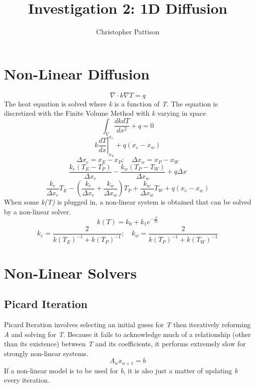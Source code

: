 \documentclass[12pt,twocolumn]{article}
\title{\vspace{-2.5em}Investigation 2: 1D Diffusion}
\author{Christopher Pattison}
\date{}
\begin{document}
\maketitle
\section*{Non-Linear Diffusion}
\[
\nabla\cdot k \nabla T = q
\]
The heat equation is solved where \emph{k} is a function of \emph{T}. The equation is discretized with the Finite
Volume Method with \emph{k} varying in space
\[\int_V\frac{dkdT}{dx^2} + q = 0\]
\[k\left.\frac{dT}{dx}\right\rvert_{x_w}^{x_e} + q(x_e-x_w)\]
\[\Delta x_e=x_E-x_P;\hspace{1em} \Delta x_w=x_P-x_W\]
\[\frac{k_e (T_E-T_P)}{\Delta x_e} - \frac{k_w (T_P-T_W)}{\Delta x_w} + q\Delta x\]
\[\frac{k_e}{\Delta x_e} T_E - (\frac{k_e}{\Delta x_e} + \frac{k_w}{\Delta x_w})T_P + \frac{k_w}{\Delta x_w} T_W + q(x_e-x_w)\]
When some \emph{k(T)} is plugged in, a non-linear system is obtained that can be solved by a non-linear solver.
\[k(T) = k_0 + k_1 e^{-\frac{T}{T_0}}\]
\[k_e = \frac{2}{k(T_E)^{-1}+k(T_P)^{-1}} ;\hspace{1em} k_w = \frac{2}{k(T_P)^{-1}+k(T_W)^{-1}}\]
\section*{Non-Linear Solvers}
\subsection*{Picard Iteration}
Picard Iteration involves selecting an initial guess for \emph{T} then iteratively reforming \emph{A} and solving for \emph{T}.
Because it fails to acknowledge much of a relationship (other than its existence) between \emph{T} and its coefficients, it
performs extremely slow for strongly non-linear systems.
\[A_nx_{n+1} = b\]
If a non-linear model is to be used for \emph{b}, it is also just a matter of updating \emph{b} every iteration.
\end{document}
